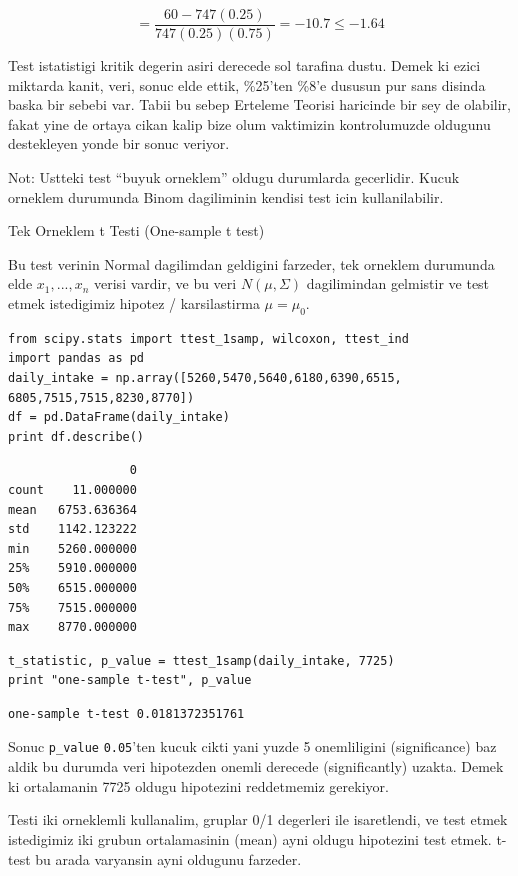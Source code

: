 \documentclass[12pt,fleqn]{article}\usepackage{../common}
\begin{document}
$$ = \frac{60-747(0.25)}{747(0.25)(0.75)} = -10.7 \le -1.64  $$

Test istatistigi kritik degerin asiri derecede sol tarafina dustu. Demek ki
ezici miktarda kanit, veri, sonuc elde ettik, \%25'ten \%8'e dususun pur
sans disinda baska bir sebebi var. Tabii bu sebep Erteleme Teorisi
haricinde bir sey de olabilir, fakat yine de ortaya cikan kalip bize olum
vaktimizin kontrolumuzde oldugunu destekleyen yonde bir sonuc veriyor.

Not: Ustteki test ``buyuk orneklem'' oldugu durumlarda gecerlidir. Kucuk
orneklem durumunda Binom dagiliminin kendisi test icin kullanilabilir.

Tek Orneklem t Testi (One-sample t test)

Bu test verinin Normal dagilimdan geldigini farzeder, tek orneklem
durumunda elde $x_1,...,x_n$ verisi vardir, ve bu veri $N(\mu,\Sigma)$
dagilimindan gelmistir ve test etmek istedigimiz hipotez /
karsilastirma $\mu = \mu_0$. 

\begin{verbatim}
from scipy.stats import ttest_1samp, wilcoxon, ttest_ind
import pandas as pd
daily_intake = np.array([5260,5470,5640,6180,6390,6515, 6805,7515,7515,8230,8770])
df = pd.DataFrame(daily_intake)
print df.describe()
\end{verbatim}

\begin{verbatim}
                 0
count    11.000000
mean   6753.636364
std    1142.123222
min    5260.000000
25%    5910.000000
50%    6515.000000
75%    7515.000000
max    8770.000000
\end{verbatim}

\begin{verbatim}
t_statistic, p_value = ttest_1samp(daily_intake, 7725)
print "one-sample t-test", p_value
\end{verbatim}

\begin{verbatim}
one-sample t-test 0.0181372351761
\end{verbatim}

Sonuc \verb!p_value! \verb!0.05!'ten kucuk cikti yani
yuzde 5 onemliligini (significance) baz aldik bu durumda veri
hipotezden onemli derecede (significantly) uzakta. Demek ki
ortalamanin 7725 oldugu hipotezini reddetmemiz gerekiyor.

Testi iki orneklemli kullanalim, gruplar 0/1 degerleri ile
isaretlendi, ve test etmek istedigimiz iki grubun ortalamasinin (mean)
ayni oldugu hipotezini test etmek. t-test bu arada varyansin ayni
oldugunu farzeder.
\end{document}
